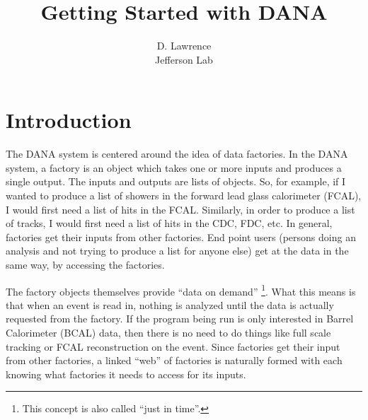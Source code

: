 \documentclass[12pt]{article}
\author{D. Lawrence \\ Jefferson Lab}
\title{Getting Started with DANA}
\begin{document}
\maketitle



\newpage
\tableofcontents
\newpage

\section{Introduction}
The DANA system is centered around the idea of data factories. In the
DANA system, a factory is an object which takes one or more inputs
and produces a single output. The inputs and outputs are lists of objects.
So, for example, if I wanted to produce a list of showers in the forward
lead glass calorimeter (FCAL), I would first need a list of hits in the
FCAL. Similarly, in order to produce a list of tracks, I would first
need a list of hits in the CDC, FDC, etc. In general, factories get their
inputs from other factories. End point users (persons doing an analysis
and not trying to produce a list for anyone else) get at the data in the
same way, by accessing the factories.

The factory objects themselves provide ``data on demand''
\footnote{This concept is also called ``just in time''.}. What this
means is that when an event is read in, nothing is analyzed until the
data is actually requested from the factory. If the program being run
is only interested in Barrel Calorimeter (BCAL) data, then there is
no need to do things like full scale tracking or FCAL reconstruction
on the event.
Since factories get their input from other factories, a linked ``web''
of factories is naturally formed with each knowing what factories it
needs to access for its inputs.
\end{document}
